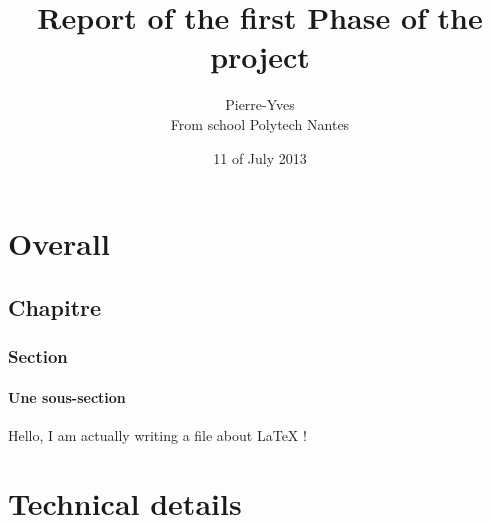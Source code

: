 \documentclass{report}
\title{Report of the first Phase of the project}
\author{Pierre-Yves \bsc{Hervo} \\From school Polytech Nantes}
\date{11\up{th} of July 2013}
\begin{document}
\maketitle
\part{Overall}
\chapter{Chapitre}
\section{Section}
\subsection{Une sous-section}
Hello, I am actually writing a file about LaTeX !
\part{Technical details}
\end{document}
